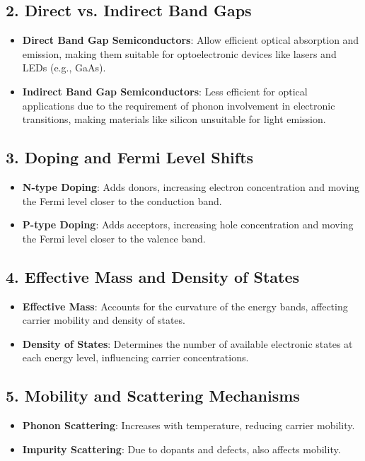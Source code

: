 \documentclass[12pt]{article}
\begin{document}
\subsection{2. Direct vs. Indirect Band Gaps}
\begin{itemize}
    \item \textbf{Direct Band Gap Semiconductors}: Allow efficient optical absorption and emission, making them suitable for optoelectronic devices like lasers and LEDs (e.g., GaAs).
    \item \textbf{Indirect Band Gap Semiconductors}: Less efficient for optical applications due to the requirement of phonon involvement in electronic transitions, making materials like silicon unsuitable for light emission.
\end{itemize}

\subsection{3. Doping and Fermi Level Shifts}
\begin{itemize}
    \item \textbf{N-type Doping}: Adds donors, increasing electron concentration and moving the Fermi level closer to the conduction band.
    \item \textbf{P-type Doping}: Adds acceptors, increasing hole concentration and moving the Fermi level closer to the valence band.
\end{itemize}

\subsection{4. Effective Mass and Density of States}
\begin{itemize}
    \item \textbf{Effective Mass}: Accounts for the curvature of the energy bands, affecting carrier mobility and density of states.
    \item \textbf{Density of States}: Determines the number of available electronic states at each energy level, influencing carrier concentrations.
\end{itemize}

\subsection{5. Mobility and Scattering Mechanisms}
\begin{itemize}
    \item \textbf{Phonon Scattering}: Increases with temperature, reducing carrier mobility.
    \item \textbf{Impurity Scattering}: Due to dopants and defects, also affects mobility.
\end{itemize}
\end{document}
